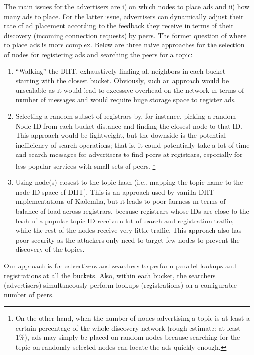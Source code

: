 The main issues for the advertisers are i) on which nodes to place ads and ii) how many ads to place. For the latter issue, advertisers can dynamically adjust their rate of ad placement according to the feedback they receive in terms of their discovery (\ie incoming connection requests) by peers. The former question of where to place ads is more complex. Below are three naive approaches for the selection of nodes for registering ads and searching the peers for a topic:
\begin{enumerate} 
\item ``Walking'' the DHT, exhaustively finding all neighbors in each bucket starting with the closest bucket. Obviously, such an approach would be unscalable as it would lead to excessive overhead on the network in terms of number of messages and would require huge storage space to register ads.
\item Selecting a random subset of registrars by, for instance, picking a random Node ID from each bucket distance and finding the closest node to that ID.
This approach would be lightweight, but the downside is the potential inefficiency of search operations; that is, it could potentially take a lot of time and search messages for advertisers to find peers at registrars, especially for less popular services with small sets of peers.
\footnote{On the other hand, when the number of nodes advertising a topic is at least a certain percentage of the whole discovery network (rough estimate: at least 1\%), ads may simply be placed on random nodes because searching for the topic on randomly selected nodes can locate the ads quickly enough.}
\item Using node(s) closest to the topic hash (i.e., mapping the topic name to the node ID space of DHT). This is an approach used by vanilla DHT implementations of Kademlia, but it leads to poor fairness in terms of balance of load across registrars, because registrars whose IDs are close to the hash of a popular topic ID receive a lot of search and registration traffic, while the rest of the nodes receive very little traffic. This approach also has poor security as the attackers only need to target few nodes to prevent the discovery of the topics.
\end{enumerate}

Our approach is for advertisers and searchers to perform parallel lookups and registrations at all the buckets. Also, within each bucket, the searchers (advertisers) simultaneously perform lookups (registrations) on a configurable number of peers. 

